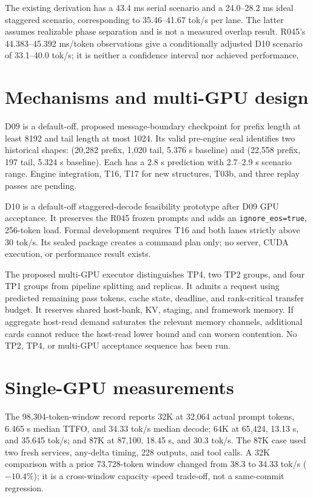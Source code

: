 \documentclass[11pt]{article}
\begin{document}
The existing derivation has a 43.4 ms serial scenario and a 24.0--28.2 ms ideal staggered scenario, corresponding to 35.46--41.67 tok/s per lane. The latter assumes realizable phase separation and is not a measured overlap result. R045's 44.383--45.392 ms/token observations give a conditionally adjusted D10 scenario of 33.1--40.0 tok/s; it is neither a confidence interval nor achieved performance.

\section{Mechanisms and multi-GPU design}
D09 is a default-off, proposed message-boundary checkpoint for prefix length at least 8192 and tail length at most 1024. Its valid pre-engine seal identifies two historical shapes: (20,282 prefix, 1,020 tail, 5.376 s baseline) and (22,558 prefix, 197 tail, 5.324 s baseline). Each has a 2.8 s prediction with 2.7--2.9 s scenario range. Engine integration, T16, T17 for new structures, T03b, and three replay passes are pending.

D10 is a default-off staggered-decode feasibility prototype after D09 GPU acceptance. It preserves the R045 frozen prompts and adds an \texttt{ignore\_eos=true}, 256-token load. Formal development requires T16 and both lanes strictly above 30 tok/s. Its sealed package creates a command plan only; no server, CUDA execution, or performance result exists.

The proposed multi-GPU executor distinguishes TP4, two TP2 groups, and four TP1 groups from pipeline splitting and replicas. It admits a request using predicted remaining pass tokens, cache state, deadline, and rank-critical transfer budget. It reserves shared host-bank, KV, staging, and framework memory. If aggregate host-read demand saturates the relevant memory channels, additional cards cannot reduce the host-read lower bound and can worsen contention. No TP2, TP4, or multi-GPU acceptance sequence has been run.

\section{Single-GPU measurements}
The 98,304-token-window record reports 32K at 32,064 actual prompt tokens, 6.465 s median TTFO, and 34.33 tok/s median decode; 64K at 65,424, 13.13 s, and 35.645 tok/s; and 87K at 87,100, 18.45 s, and 30.3 tok/s. The 87K case used two fresh services, any-delta timing, 228 outputs, and tool calls. A 32K comparison with a prior 73,728-token window changed from 38.3 to 34.33 tok/s ($-10.4\%$); it is a cross-window capacity--speed trade-off, not a same-commit regression.
\end{document}
